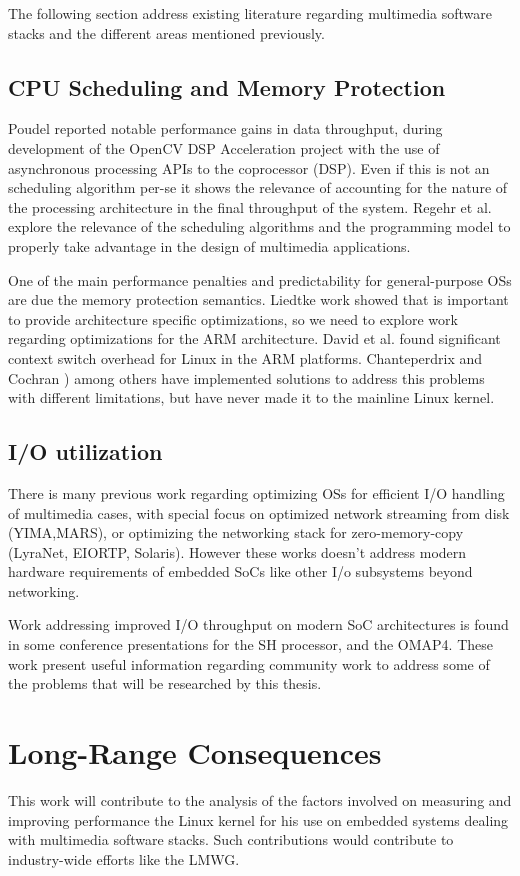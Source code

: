 The following section address existing literature regarding multimedia software stacks and the different areas mentioned previously.

\subsection{CPU Scheduling and Memory Protection}
Poudel\cite{Poudel:ys} reported notable performance gains in data throughput, during development of the OpenCV DSP Acceleration project with the use of asynchronous processing APIs to the coprocessor (\ac{DSP}). Even if this is not an scheduling algorithm per-se it shows the relevance of accounting for the nature of the processing architecture in the final throughput of the system. Regehr et al.\cite{Regehr00operatingsystem} explore the relevance of the scheduling algorithms and the programming model to properly take advantage in the design of multimedia applications.

One of the main performance penalties and predictability for general-purpose \acp{OS} are due the memory protection semantics\cite{Blackham_SH_11}. Liedtke\citep{Liedtke:1995kx}  work showed that is important to provide architecture specific optimizations, so we need to explore work regarding optimizations for the \ac{ARM} architecture. David et al.\citep{David:2007:CSO:1281700.1281703}  found significant context switch overhead for Linux in the \ac{ARM} platforms. Chanteperdrix and Cochran \citep{Chanteperdrix:2009fk}) among others have implemented solutions to address this problems with different limitations, but have never made it to the mainline Linux kernel.

\subsection{I/O utilization}
There is many previous work regarding optimizing \acp{OS} for efficient I/O handling of multimedia cases, with special focus on optimized network streaming from disk (YIMA\cite{Shahabi:2002vn},MARS\cite{Jane98enhancementsto}), or optimizing the networking stack for zero-memory-copy (LyraNet\cite{10.1109/RTCSA.2005.57},  EIORTP\cite{springerlink:10.1007/s11390-006-0989-5}, Solaris\cite{Chu96zero-copytcp}). However these works doesn't address modern hardware requirements of embedded \ac{SoC}s like other I/o subsystems beyond networking.

Work addressing improved I/O throughput on modern \ac{SoC} architectures is found in some conference presentations for the SH processor\cite{Parker:2009fk}, and the OMAP4\cite{Clark:2010uq}. These work present useful information regarding community work to address some of the problems that will be researched by this thesis.

\section{Long-Range Consequences}
This work will contribute to the analysis of the factors involved on measuring and improving performance the Linux kernel for his use on embedded systems dealing with multimedia software stacks. Such contributions would contribute to industry-wide efforts like the \ac{LMWG}. 
